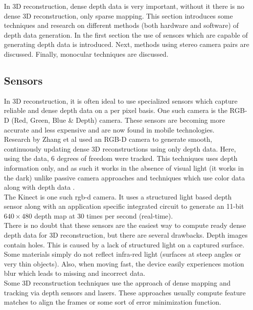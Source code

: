 
In 3D reconstruction, dense depth data is very important, without it there is no dense 3D reconstruction, only sparse mapping. This section introduces some techniques and research on different methods (both hardware and software) of depth data generation. In the first section the use of sensors which are capable of generating depth data is introduced. Next, methods using stereo camera pairs are discussed. Finally, monocular techniques are discussed. \\


\subsection{Sensors}

In 3D reconstruction, it is often ideal to use specialized sensors which capture reliable and dense depth data on a per pixel basis. One such camera is the RGB-D (Red, Green, Blue \& Depth) camera. These sensors are becoming more accurate and less expensive and are now found in mobile technologies. \\

Research by Zhang et al \cite{Zhang12Microsoft} used an RGB-D camera to generate smooth, continuously updating dense 3D reconstructions using only depth data. Here, using the data, 6 degrees of freedom were tracked. This techniques uses depth information only, and as such it works in the absence of visual light (it works in the dark) unlike passive camera approaches \cite{Klein07Parallel, Newcombe10Live,Stuhmer10Real} and techniques which use color data along with depth data \cite{Henry10Rgb}. \\

The Kinect is one such rgb-d camera. It uses a structured light based depth sensor along with an application specific integrated circuit to generate an 11-bit $640\times 480$ depth map at 30 times per second (real-time). \\

There is no doubt that these sensors are the easiest way to compute ready dense depth data for 3D reconstruction, but there are several drawbacks. Depth images contain holes. This is caused by a lack of structured light on a captured surface. Some materials simply do not reflect infra-red light (surfaces at steep angles or very thin objects). Also, when moving fast, the device easily experiences motion blur which leads to missing and incorrect data. \\

Some 3D reconstruction techniques use the approach of dense mapping and tracking via depth sensors and lasers. These approaches usually compute feature matches to align the frames or some sort of error minimization function.


